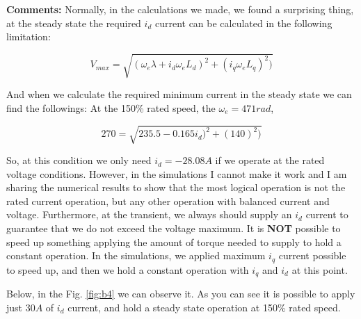 \textbf{Comments:} Normally, in the calculations we made, we found a surprising thing, at the steady state the required $i_d$ current can be calculated in the following limitation:

$$ V_{max} = \sqrt{(\omega_e \lambda + i_d \omega_e L_d)^2 + (i_q \omega_e L_q)^2)}$$

And when we calculate the required minimum current in the steady state we can find the followings: At the 150\% rated speed, the $\omega_e = 471 rad$, 

$$ 270 = \sqrt{235.5 - 0.165i_d)^2 + (140)^2) } $$

So, at this condition we only need $i_d = -28.08A$ if we operate at the rated voltage conditions. However, in the simulations I cannot make it work and I am sharing the numerical results to show that the most logical operation is not the rated current operation, but any other operation with balanced current and voltage. Furthermore, at the transient, we always should supply an $i_d$ current to guarantee that we do not exceed the voltage maximum. It is \textbf{NOT} possible to speed up something applying the amount of torque needed to supply to hold a constant operation. In the simulations, we applied maximum $i_q$ current possible to speed up, and then we hold a constant operation with $i_q$ and $i_d$ at this point.

Below, in the Fig. \ref{fig:b4} we can observe it. As you can see it is possible to apply just $30A$ of $i_d$ current, and hold a steady state operation at 150\% rated speed.

